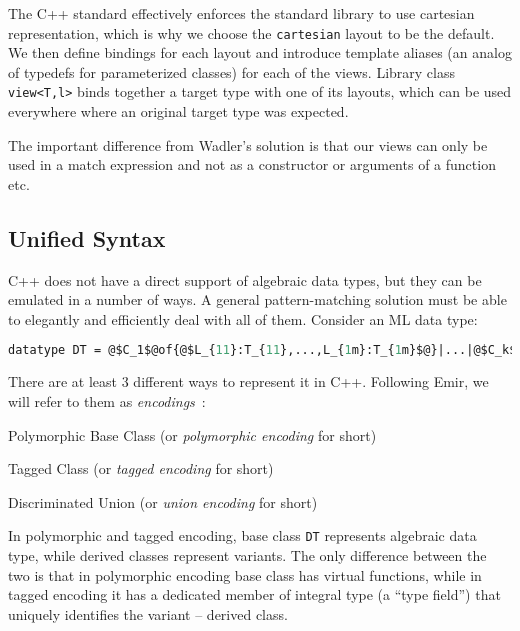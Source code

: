 \documentclass{llncs}
\makeatletter
\DeclareRobustCommand{\code}[1]{{\lstinline[keepspaces,breaklines=false,escapechar=@]{#1}}}
\makeatother
\begin{document}
\noindent
The C++ standard effectively enforces the standard library to use cartesian 
representation\cite[-4]{C++11}, which is why we choose the 
\code{cartesian} layout to be the default. We then define bindings for each 
layout and introduce template aliases (an analog of typedefs for parameterized 
classes) for each of the views. Library class \code{view<T,l>} binds together a 
target type with one of its layouts, which can be used everywhere where an 
original target type was expected.

The important difference from Wadler's solution is that our views can only be 
used in a match expression and not as a constructor or arguments of a function 
etc.

\subsection{Unified Syntax}
\label{sec:unisyn}

C++ does not have a direct support of algebraic data types, but they can be 
emulated in a number of ways. A general pattern-matching solution must be able 
to elegantly and efficiently deal with all of them. Consider an ML data type: 

\begin{lstlisting}[language=ML,escapechar=@]
datatype DT = @$C_1$@of{@$L_{11}:T_{11},...,L_{1m}:T_{1m}$@}|...|@$C_k$@of{@$L_{k1}:T_{k1},...,L_{kn}:T_{kn}$@}
\end{lstlisting}

\noindent There are at least 3 different ways to represent it in C++. Following 
Emir, we will refer to them as \emph{encodings}~\cite{EmirThesis}:

\begin{compactitem}
\setlength{\itemsep}{0pt}
\setlength{\parskip}{0pt}
\item Polymorphic Base Class (or \emph{polymorphic encoding} for short)
\item Tagged Class (or \emph{tagged encoding} for short)
\item Discriminated Union (or \emph{union encoding} for short)
\end{compactitem}

\noindent
In polymorphic and tagged encoding, base class \code{DT} represents algebraic 
data type, while derived classes represent variants. The only difference between 
the two is that in polymorphic encoding base class has virtual functions, while 
in tagged encoding it has a dedicated member of integral type  (a ``type field'')  that uniquely 
identifies the variant -- derived class. 
\end{document}
